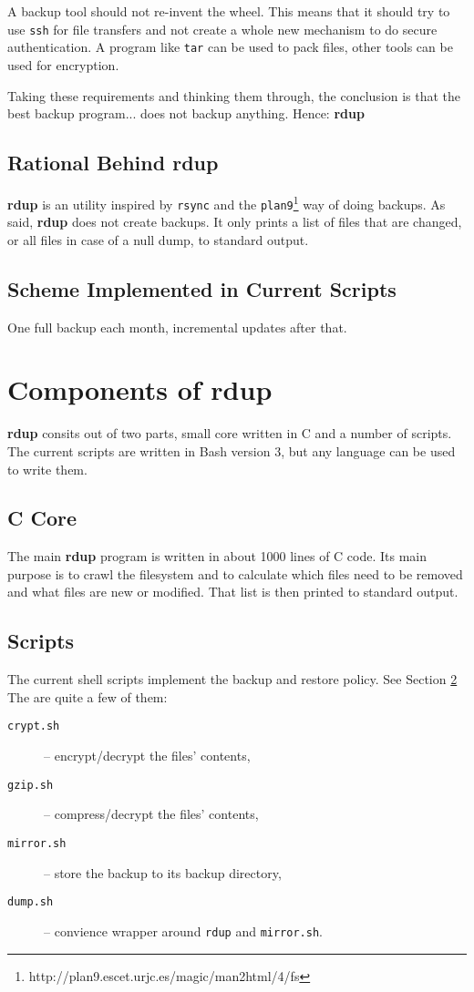 \documentclass[a4paper, openany]{memoir}
\newcommand{\rdup}{\textbf{rdup}}
\newcommand{\cmd}[1]{\texttt{#1}}
\begin{document}
A backup tool should not re-invent the wheel.  This means that it should
try to use \cmd{ssh} for file transfers and not create a whole new
mechanism to do secure authentication. A program like \cmd{tar} can be
used to pack files, other tools can be used for encryption. 

Taking these requirements and thinking them through, the
conclusion is that the best backup program... does not backup anything.
Hence: \rdup

\section{Rational Behind \rdup}
\rdup{} is an utility inspired by \cmd{rsync} and the 
\cmd{plan9}\footnote{http://plan9.escet.urjc.es/magic/man2html/4/fs} 
way of doing backups. As said, \rdup{} does not create backups. It only
prints a list of files that are changed, or all files in case of a null
dump, to standard output. 

\section{Scheme Implemented in Current Scripts}
\label{sec:scheme implemented in current scripts}
One full backup each month, incremental updates after that.


\chapter{Components of \rdup}

\rdup{} consits out of two parts, small core written in C and
a number of scripts. The current scripts are written in 
Bash version 3, but any language can be used to write them.


\section{C Core}
The main \rdup{} program is written in about 1000 lines of C code. Its
main purpose is to crawl the filesystem and to calculate which files
need to be removed and what files are new or modified. That list is then
printed to standard output.

\section{Scripts}
The current shell scripts implement the backup and restore policy. See
Section \ref{sec:scheme implemented in current scripts}
The are quite a few of them:
\begin{description}
\item[\cmd{crypt.sh}]{-- encrypt/decrypt the files' contents,}
\item[\cmd{gzip.sh}]{-- compress/decrypt the files' contents,}
\item[\cmd{mirror.sh}]{-- store the backup to its backup directory,}
\item[\cmd{dump.sh}]{-- convience wrapper around \cmd{rdup} and \cmd{mirror.sh}.}
\end{description}
\end{document}
